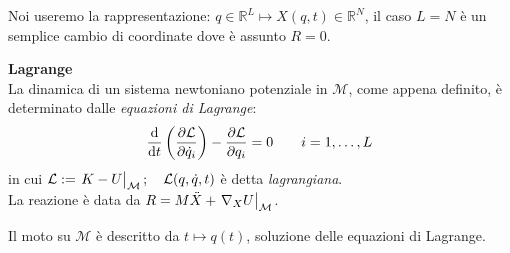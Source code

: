 Noi useremo la rappresentazione: $q \in \mathbb{R}^L \mapsto X(q, t) \in \mathbb{R}^N$, 
il caso $L= N$ è un semplice cambio di coordinate dove è assunto $R =0$.
\begin{theorem}
    \textbf{Lagrange}\\
    La dinamica di un sistema newtoniano potenziale in $\mathcal{M}$, come appena definito, è determinato dalle \textit{equazioni di Lagrange}:
    \begin{equation}
        \dv{}{t}\left( \pdv{\mathcal{L}}{\dot{q}_i} \right)-\pdv{\mathcal{L}}{q_i}=0 \qquad i = 1,\dots, L 
    \end{equation}
    in cui $\mathcal{L}:= \eval{K-U}_{\mathcal{M}};\quad \mathcal{L}(q,\dot{q},t)$ è detta \textit{lagrangiana}. \\
    La reazione è data da $R = M\ddot{X}+\eval{\nabla_X U }_{\mathcal{M}}$.
\end{theorem}
\begin{remark}
    Il moto su $\mathcal{M}$ è descritto da $t\mapsto q(t)$, soluzione delle equazioni di Lagrange.
\end{remark}
